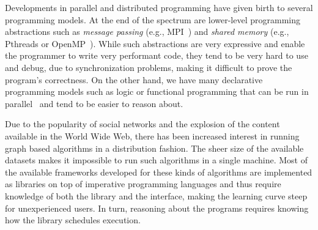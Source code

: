 
\begin{comment}
The last decade has seen a priority shift for processor companies. If clock frequency
was once the main metric for performance, today computing power is measured in number of
cores in a single chip.
For software developers and computer scientists, once focused in developing sequential programs,
newer hardware usually meant faster programs without any change to the source code. Today,
the free lunch is over. Multicore processors are now forcing the development of
new software methodologies that take advantage of increasing processing power through parallelism.
However, parallel programming is difficult, usually because programs are written
in imperative and stateful programming languages that make use of low level synchronization
primitives such as locks, mutexes and barriers. This tends to make the task of managing multithreaded
execution quite intricate and error-prone, resulting in race hazards and deadlocks.
In the future, \emph{many-core} processors will make this task look even more daunting.

Advances in network speed and bandwidth are making distributed computing
more appealing. For instance, \emph{cloud computing} is a new emerging paradigm that wants
to make every computer connected to the Internet as a client of a pool of computing power,
where data can be retrieved and computation performed. From the perspective of high performance
computing, the \emph{computer cluster} is a well established paradigm that uses fast local area
networks to improve performance and solve problems that would take a long time with a single computer.
\end{comment}

Developments in parallel and distributed programming have given birth to several programming models.
At the end of the spectrum are lower-level programming abstractions such as
\emph{message passing} (e.g., MPI~\cite{gabriel04-open-mpi}) and \emph{shared memory}
(e.g., Pthreads or OpenMP~\cite{Chapman-2007-UOP-1370966}).
While such abstractions are very expressive and enable the programmer to write very performant code,
they tend to be very hard to use and debug, due to synchronization problems, making it difficult to
prove the program's correctness. On the other hand, we have many declarative programming models
such as logic or functional programming
that can be run in parallel~\cite{Blelloch:1996:PPA:227234.227246} and tend to be easier to reason about.

Due to the popularity of social networks and the explosion of the content available in the World Wide Web, there has been
increased interest in running graph based algorithms in a distribution fashion. The sheer size of
the available datasets makes it impossible to run such algorithms in a single machine.
Most of the available frameworks developed for these kinds of algorithms are implemented as libraries on top
of imperative programming languages and thus require knowledge of both the library and the interface, making
the learning curve steep for unexperienced users. In turn, reasoning about the programs requires knowing how
the library schedules execution.

